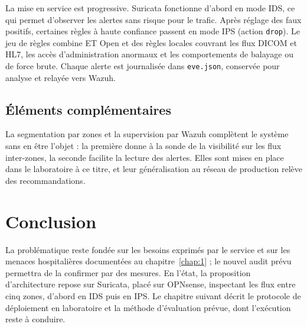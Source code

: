 La mise en service est progressive. Suricata fonctionne d'abord en mode IDS, ce qui permet d'observer les alertes sans risque pour le trafic. Après réglage des faux positifs, certaines règles à haute confiance passent en mode IPS (action \texttt{drop}). Le jeu de règles combine ET Open et des règles locales couvrant les flux DICOM et HL7, les accès d'administration anormaux et les comportements de balayage ou de force brute. Chaque alerte est journalisée dans \texttt{eve.json}, conservée pour analyse et relayée vers Wazuh.

\subsection{Éléments complémentaires}

La segmentation par zones et la supervision par Wazuh complètent le système sans en être l'objet : la première donne à la sonde de la visibilité sur les flux inter-zones, la seconde facilite la lecture des alertes. Elles sont mises en place dans le laboratoire à ce titre, et leur généralisation au réseau de production relève des recommandations.

\section*{Conclusion}

La problématique reste fondée sur les besoins exprimés par le service et sur les menaces hospitalières documentées au chapitre~\ref{chap:1} ; le nouvel audit prévu permettra de la confirmer par des mesures. En l'état, la proposition d'architecture repose sur Suricata, placé sur OPNsense, inspectant les flux entre cinq zones, d'abord en IDS puis en IPS. Le chapitre suivant décrit le protocole de déploiement en laboratoire et la méthode d'évaluation prévue, dont l'exécution reste à conduire.
